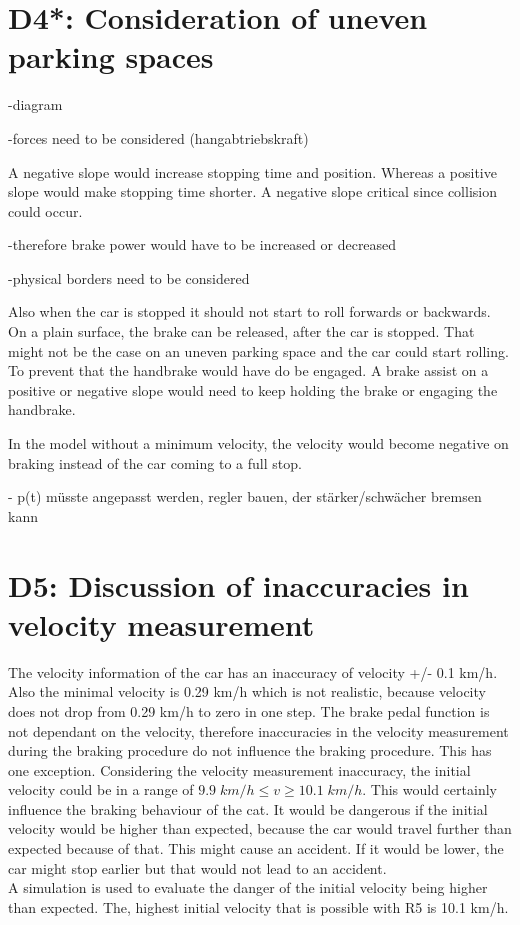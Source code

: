 \chapter{D4*: Consideration of uneven parking spaces}\label{cha:D4}

-diagram

-forces need to be considered (hangabtriebskraft)

A negative slope would increase stopping time and position. Whereas a positive slope would make stopping time shorter.
A negative slope critical since collision could occur.


-therefore brake power would have to be increased or decreased

-physical borders need to be considered

Also when the car is stopped it should not start to roll forwards or backwards.
On a plain surface, the brake can be released, after the car is stopped. That might not be the case on an uneven parking space and the car could start rolling. To prevent that the handbrake would have do be engaged.
A brake assist on a positive or negative slope would need to keep holding the brake or engaging the handbrake.

In the model without a minimum velocity, the velocity would become negative on braking instead of the car coming to a full stop.

- p(t) müsste angepasst werden, regler bauen, der stärker/schwächer bremsen kann 

\chapter{D5: Discussion of inaccuracies in velocity measurement}\label{cha:D5}



The velocity information of the car has an inaccuracy of velocity +/- 0.1 km/h. Also the minimal velocity is 0.29 km/h which is not realistic, because velocity does not drop from 0.29 km/h to zero in one step. The brake pedal function is not dependant on the velocity, therefore inaccuracies in the velocity measurement during the braking procedure do not influence the braking procedure. This has one exception.
Considering the velocity measurement inaccuracy, the initial velocity could be in a range of $9.9\; km/h \leq v  \geq 10.1\; km/h$. This would certainly influence the braking behaviour of the cat. It would be dangerous if the initial velocity would be higher than expected, because the car would travel further than expected because of that. This might cause an accident. If it would be lower, the car might stop earlier but that would not lead to an accident.\\
A simulation is used to evaluate the danger of the initial velocity being higher than expected. The, highest initial velocity that is possible with R5 is 10.1 km/h.







